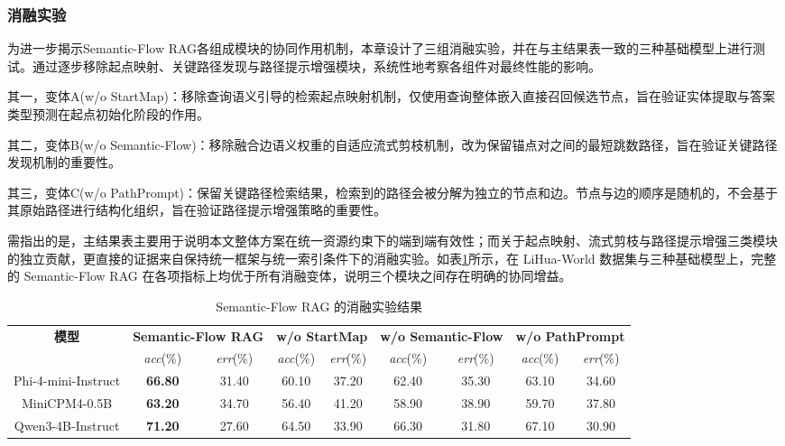 \documentclass[promaster, vlined]{DissertUESTC}
\begin{document}
\subsubsection{消融实验}
为进一步揭示Semantic-Flow RAG各组成模块的协同作用机制，本章设计了三组消融实验，并在与主结果表一致的三种基础模型上进行测试。通过逐步移除起点映射、关键路径发现与路径提示增强模块，系统性地考察各组件对最终性能的影响。

其一，变体A(w/o StartMap)：移除查询语义引导的检索起点映射机制，仅使用查询整体嵌入直接召回候选节点，旨在验证实体提取与答案类型预测在起点初始化阶段的作用。

其二，变体B(w/o Semantic-Flow)：移除融合边语义权重的自适应流式剪枝机制，改为保留锚点对之间的最短跳数路径，旨在验证关键路径发现机制的重要性。

其三，变体C(w/o PathPrompt)：保留关键路径检索结果，检索到的路径会被分解为独立的节点和边。节点与边的顺序是随机的，不会基于其原始路径进行结构化组织，旨在验证路径提示增强策略的重要性。

需指出的是，主结果表主要用于说明本文整体方案在统一资源约束下的端到端有效性；而关于起点映射、流式剪枝与路径提示增强三类模块的独立贡献，更直接的证据来自保持统一框架与统一索引条件下的消融实验。如表\ref{tab:semantic_flow_ablation}所示，在 LiHua-World 数据集与三种基础模型上，完整的 Semantic-Flow RAG 在各项指标上均优于所有消融变体，说明三个模块之间存在明确的协同增益。

\begin{table}[!ht]
\centering
\caption{Semantic-Flow RAG 的消融实验结果}
\label{tab:semantic_flow_ablation}
\setlength{\tabcolsep}{2.8pt}
\small
\begin{tabular*}{\textwidth}{@{\extracolsep{\fill}}ccccccccc}
\toprule
\multirow{2}{*}{\textbf{模型}} & \multicolumn{2}{c}{\textbf{Semantic-Flow RAG}} & \multicolumn{2}{c}{\textbf{w/o StartMap}} & \multicolumn{2}{c}{\textbf{w/o Semantic-Flow}} & \multicolumn{2}{c}{\textbf{w/o PathPrompt}} \\
\cmidrule(lr){2-3} \cmidrule(lr){4-5} \cmidrule(lr){6-7} \cmidrule(lr){8-9}
& \textit{acc}(\%) & \textit{err}(\%) & \textit{acc}(\%) & \textit{err}(\%) & \textit{acc}(\%) & \textit{err}(\%) & \textit{acc}(\%) & \textit{err}(\%) \\
\midrule
Phi-4-mini-Instruct & \textbf{66.80} & 31.40 & 60.10 & 37.20 & 62.40 & 35.30 & 63.10 & 34.60 \\
MiniCPM4-0.5B & \textbf{63.20} & 34.70 & 56.40 & 41.20 & 58.90 & 38.90 & 59.70 & 37.80 \\
Qwen3-4B-Instruct & \textbf{71.20} & 27.60 & 64.50 & 33.90 & 66.30 & 31.80 & 67.10 & 30.90 \\
\bottomrule
\end{tabular*}
\end{table}
\end{document}
